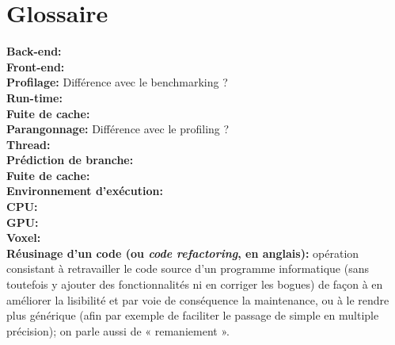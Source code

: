 \documentclass[10pt]{report}
\begin{document}
\chapter*{Glossaire}
\noindent
\textbf{Back-end:}\\ 
\textbf{Front-end:}\\
\textbf{Profilage:} Différence avec le benchmarking ?\\
\textbf{Run-time:}\\
\textbf{Fuite de cache:}\\
\textbf{Parangonnage:} Différence avec le profiling ?\\
\textbf{Thread:}\\
\textbf{Prédiction de branche:}\\
\textbf{Fuite de cache:}\\
\textbf{Environnement d'exécution:}\\
\textbf{CPU:}\\
\textbf{GPU:}\\
\textbf{Voxel:}\\
\textbf{Réusinage d'un code (ou \textit{code refactoring}, en anglais):} opération consistant à retravailler le code source d'un programme informatique (sans toutefois y ajouter des fonctionnalités ni en corriger les bogues) de façon à en améliorer la lisibilité et par voie de conséquence la maintenance, ou à le rendre plus générique (afin par exemple de faciliter le passage de simple en multiple précision); on parle aussi de « remaniement ». 

\end{document}
